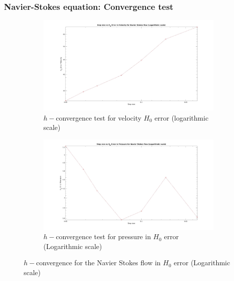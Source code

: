 \documentclass{beamer}
\begin{document}
\begin{frame}
\frametitle{Navier-Stokes equation: Convergence test}
\begin{figure}
\begin{subfigure}{0.4\textwidth}	
  \includegraphics[width=\linewidth]{H0_convergence_velocity_n_s_log.jpg}
  \caption{$h-$convergence test for velocity $H_0$ error (logarithmic scale)}
  \label{fig:vel_navier_stoke_conv_log_h0}
\end{subfigure}
\begin{subfigure}{0.4\textwidth}	
  \includegraphics[width=\linewidth]{H0_convergence_pressure_n_s_log.jpg}
  \caption{$h-$convergence test for pressure in $H_0$ error (Logarithmic scale)}
  \label{fig:pre_navier_stoke_conv_log_h0}
\end{subfigure}
\caption{$h-$convergence for the Navier Stokes flow in $H_0$ error (Logarithmic scale)}
\label{navier_stoke_conv_h0_log}
\end{figure}
\end{frame}
\end{document}
